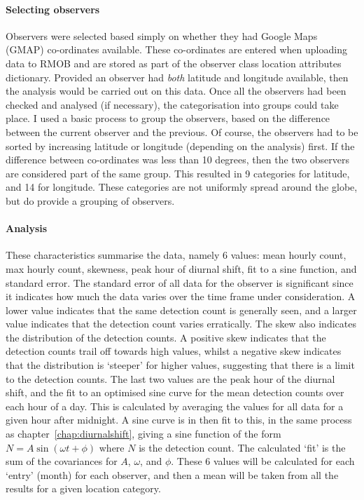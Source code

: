 \paragraph{Selecting observers\\}
Observers were selected based simply on whether they had Google Maps (GMAP) co-ordinates available. These co-ordinates are entered when uploading data to RMOB and are stored as part of the observer class location attributes dictionary. Provided an observer had {\it both} latitude and longitude available, then the analysis would be carried out on this data. Once all the observers had been checked and analysed (if necessary), the categorisation into groups could take place.
I used a basic process to group the observers, based on the difference between the current observer and the previous. Of course, the observers had to be sorted by increasing latitude or longitude (depending on the analysis) first. If the difference between co-ordinates was less than 10 degrees, then the two observers are considered part of the same group. This resulted in 9 categories for latitude, and 14 for longitude. These categories are not uniformly spread around the globe, but do provide a grouping of observers.
\paragraph{Analysis\\}
These characteristics summarise the data, namely 6 values: mean hourly count, max hourly count, skewness, peak hour of diurnal shift, fit to a sine function, and standard error. The standard error of all data for the observer is significant since it indicates how much the data varies over the time frame under consideration. A lower value indicates that the same detection count is generally seen, and a larger value indicates that the detection count varies erratically. The skew also indicates the distribution of the detection counts. A positive skew indicates that the detection counts trail off towards high values, whilst a negative skew indicates that the distribution is `steeper' for higher values, suggesting that there is a limit to the detection counts. The last two values are the peak hour of the diurnal shift, and the fit to an optimised sine curve for the mean detection counts over each hour of a day. This is calculated by averaging the values for all data for a given hour after midnight. A sine curve is in then fit to this, in the same process as chapter~\ref{chap:diurnalshift}, giving a sine function of the form $N = A \sin \left( \omega t + \phi \right)$ where $N$ is the detection count. The calculated `fit' is the sum of the covariances for $A$, $\omega$, and $\phi$. 
These 6 values will be calculated for each `entry' (month) for each observer, and then a mean will be taken from all the results for a given location category.

